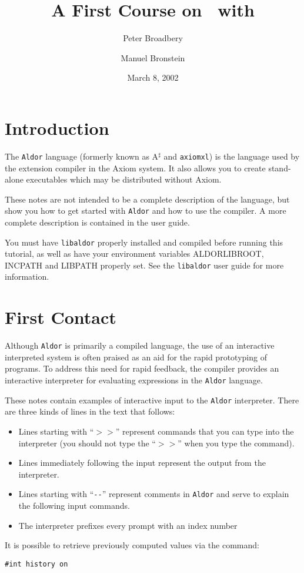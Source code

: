 \documentclass{article}
\title{A First Course on \Aldor~with \libaldor{}}
\author{Peter Broadbery \and Manuel Bronstein}
\date{March 8, 2002}
\newcommand{\libaldor}{{\tt libaldor}}
\newcommand{\Aldor}{{\tt Aldor}}
\newcommand{\alprompt}{{\tt $>>$}}
\begin{document}
\maketitle
\setlength{\parindent}{0pt}
\setlength{\parskip}{1em}

\section{Introduction}

The \Aldor{} language (formerly known as A$^\sharp$ and {\tt axiomxl}) is
the language used by the extension compiler in the Axiom system.  It
also allows you to create stand-alone executables which may be
distributed without Axiom.

These notes are not intended to be a complete description of the
language, but show you how to get started with \Aldor{} and how to use
the compiler.  A more complete description is contained in the user
guide.

You must have \libaldor{} properly installed and compiled before running this
tutorial, as well as have your environment variables ALDORLIBROOT, INCPATH
and LIBPATH properly set. See the \libaldor{} user guide for more information.

\section{First Contact}


Although \Aldor{} is primarily a compiled language, the use of an
interactive interpreted system is often praised as an aid for the
rapid prototyping of programs.  To address this need for rapid
feedback, the compiler provides an interactive interpreter for
evaluating expressions in the \Aldor{} language.

These notes contain examples of interactive input to the \Aldor{}
interpreter.  There are three kinds of lines in the text that follows:
\begin{itemize}
\item Lines starting with ``\alprompt'' represent commands that you can
type into the interpreter (you should not type the ``\alprompt'' when you
type the command).  
\item Lines immediately following the input represent the output from
the interpreter.
\item Lines starting with ``{\tt -{}-}'' represent comments in \Aldor{}
and serve to explain the following input commands. 
\item The interpreter prefixes every prompt with an index number
\end{itemize}
It is possible to retrieve previously computed values via the command:
\begin{small}
\begin{verbatim}
#int history on
\end{verbatim}
\end{small}
\end{document}
